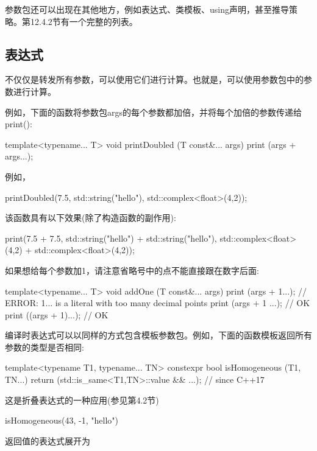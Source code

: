 
参数包还可以出现在其他地方，例如表达式、类模板、using声明，甚至推导策略。第12.4.2节有一个完整的列表。

\subsection{表达式}

不仅仅是转发所有参数，可以使用它们进行计算。也就是，可以使用参数包中的参数进行计算。

例如，下面的函数将参数包args的每个参数都加倍，并将每个加倍的参数传递给print():

\begin{cpp}
template<typename... T>
void printDoubled (T const&... args)
{
	print (args + args...);
}
\end{cpp}

例如，

\begin{cpp}
printDoubled(7.5, std::string("hello"), std::complex<float>(4,2));
\end{cpp}

该函数具有以下效果(除了构造函数的副作用):

\begin{cpp}
print(7.5 + 7.5,
	std::string("hello") + std::string("hello"),
	std::complex<float>(4,2) + std::complex<float>(4,2));
\end{cpp}

如果想给每个参数加1，请注意省略号中的点不能直接跟在数字后面:

\begin{cpp}
template<typename... T>
void addOne (T const&... args)
{
	print (args + 1...); // ERROR: 1... is a literal with too many decimal points
	print (args + 1 ...); // OK
	print ((args + 1)...); // OK
}
\end{cpp}

编译时表达式可以以同样的方式包含模板参数包。例如，下面的函数模板返回所有参数的类型是否相同:

\begin{cpp}
template<typename T1, typename... TN>
constexpr bool isHomogeneous (T1, TN...)
{
	return (std::is_same<T1,TN>::value && ...); // since C++17
}
\end{cpp}

这是折叠表达式的一种应用(参见第4.2节)

\begin{cpp}
isHomogeneous(43, -1, "hello")
\end{cpp}

返回值的表达式展开为

